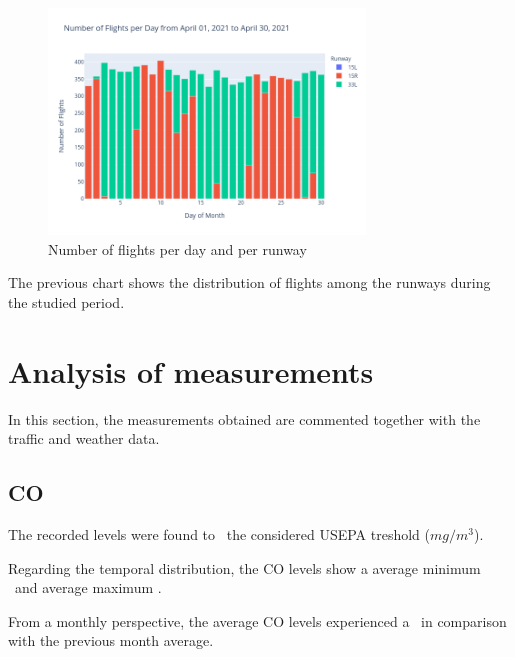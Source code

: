 \documentclass[12pt, oneside]{book}
\begin{document}
{\begin{figure}[H]
\centering
\includegraphics[width=0.75\textwidth, keepaspectratio]{image9}
\caption{Number of flights per day and per runway}\label{image9}
\end{figure}}{}

The previous chart shows the distribution of flights among the runways during the studied period. 


\chapter{Analysis of measurements}

In this section, the measurements obtained are commented together with the traffic and weather data. 

\section{CO}

The recorded  levels were found to \tresholdCO\ the considered USEPA treshold (\limitCO $mg/m^3$).


Regarding the temporal distribution, the CO levels show a average minimum \minDailyCO\ and average maximum \maxDailyCO .

From a monthly perspective, the average CO levels experienced a \monthChangeCO\ in comparison with the previous month average.
\end{document}
